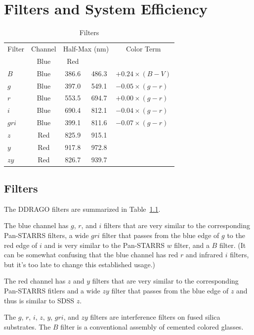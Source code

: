 \chapter{Filters and System Efficiency}

\begin{table}
\centering
\caption{Filters}
\medskip
\label{table:filters}
\begin{tabular}{lcccl}
\toprule
Filter&Channel&\multicolumn{2}{c}{Half-Max (nm)}&\multicolumn{1}{c}{Color Term}\\
\cmidrule{2-3}
&Blue&Red\\
\midrule
$B$   & Blue & 386.6 & 486.3 &$+0.24 \times (B-V)$\\
$g$   & Blue & 397.0 & 549.1 &$-0.05 \times (g-r)$\\
$r$   & Blue & 553.5 & 694.7 &$+0.00 \times (g-r)$\\
$i$   & Blue & 690.4 & 812.1 &$-0.04 \times (g-r)$\\
$gri$ & Blue & 399.1 & 811.6 &$-0.07 \times (g-r)$\\
$z$   & Red  & 825.9 & 915.1 \\
$y$   & Red  & 917.8 & 972.8 \\
$zy$  & Red  & 826.7 & 939.7 \\
\bottomrule
\end{tabular}
\end{table}


\section{Filters}

The DDRAGO filters are summarized in Table~\ref{table:filters}.

The blue channel has $g$, $r$, and $i$ filters that are very similar to the corresponding Pan-STARRS filters, a wide $gri$ filter that passes from the blue edge of $g$ to the red edge of $i$ and is very similar to the Pan-STARRS $w$ filter, and a $B$ filter. (It can be somewhat confusing that the blue channel has red $r$ and infrared $i$ filters, but it's too late to change this established usage.)

The red channel has $z$ and $y$ filters that are very similar to the corresponding Pan-STARRS fitlers and a wide $zy$ filter that passes from the blue edge of $z$ and thus is similar to SDSS $z$.

The $g$, $r$, $i$, $z$, $y$, $gri$, and $zy$ filters are interference filters on fused silica substrates. The $B$ filter is a conventional assembly of cemented colored glasses.

